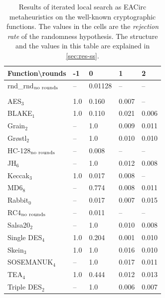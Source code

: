 \documentclass[
    digital,    %
    oneside,    %
    color,
    11pt,
    nocover,
    notable,
    nolof,
    nolot,
]{fithesis3}
\newcommand{\fd}{\cellcolor{myred!15}}
\newcommand{\fn}{\cellcolor{mygreen!20}}
\begin{document}
\begin{table}[t]
\centering
\begin{tabular}{l|l l l l}
\textbf{\large Function\textbackslash{}rounds} & \textbf{\large -1} & \textbf{\large 0} & \textbf{\large 1} & \textbf{\large 2}\\ \hline
rnd\_rnd$_{\textnormal{no rounds}}$ & --  & \fn{}0.01128& --   & -- \\\\
AES$_{3}$        & \fd{}1.0   & \fd{}0.160 & \fn{}0.007 & \fn{}--   \\
BLAKE$_{1}$      & \fd{}1.0   & \fd{}0.110 & \fn{}0.021 & \fn{}0.006\\
Grain$_{2}$      & \fd{}--    & \fd{}1.0   & \fn{}0.009 & \fn{}0.011\\
Gr\o stl$_{2}$   & \fd{}--    & \fd{}1.0   & \fn{}0.010 & \fn{}0.010\\
HC-128$_{\textnormal{no rounds}}$& -- & \fn{}0.008 & -- & --        \\
JH$_{6}$         & \fd{}--    & \fd{}1.0   & \fn{}0.012 & \fn{}0.008\\
Keccak$_{3}$     & \fd{}1.0   & \fn{}0.017 & \fn{}0.008 & \fn{}--   \\
MD6$_{8}$        & \fd{}--    & \fd{}0.774 & \fn{}0.008 & \fn{}0.011\\
Rabbit$_{0}$     &      --    & \fn{}0.017 & \fn{}0.007 & \fn{}0.015\\
RC4$_{\textnormal{no rounds}}$& -- & \fn{}0.011 & --    & --        \\
Salsa20$_{2}$    & \fd{}--    & \fd{}1.0   & \fn{}0.010 & \fn{}0.008\\
Single DES$_{4}$ & \fd{}1.0   & \fd{}0.204 & \fn{}0.001 & \fn{}0.010\\
Skein$_{3}$      & \fd{}1.0   & \fd{}1.0   & \fn{}0.016 & \fn{}0.010\\
SOSEMANUK$_{4}$  & \fd{}--    & \fd{}1.0   & \fn{}0.017 & \fn{}0.011\\
TEA$_{4}$        & \fd{}1.0   & \fd{}0.444 & \fn{}0.012 & \fn{}0.013\\
Triple DES$_{2}$ & \fd{}--    & \fd{}1.0   & \fn{}0.006 & \fn{}0.007
\end{tabular}
\caption{Results of iterated local search as EACirc metaheuristics on the well-known cryptographic functions. The values in the cells are the \textit{rejection rate} of the randomness hypothesis. The structure and the values in this table are explained in \cref{sec:res-ss}.}
\label{table:res-usable-ils}
\end{table}
\end{document}

